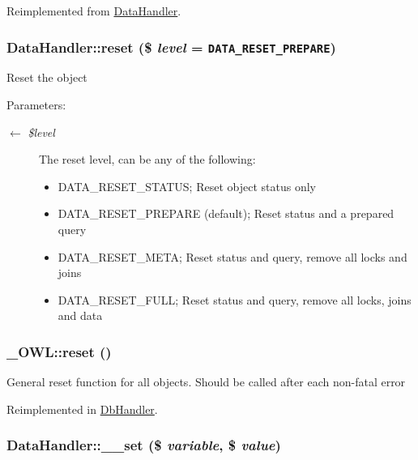 Reimplemented from \hyperlink{classDataHandler_f58cbd10b032e4904fa15ce950d521e2}{DataHandler}.\hypertarget{classDataHandler_b89e1aaad9cd0a37f1c7f13c1d9c0d57}{
\subsubsection{\setlength{\rightskip}{0pt plus 5cm}DataHandler::reset (\$ {\em level} = {\tt {\bf DATA\_\-RESET\_\-PREPARE}})}}
\label{classDataHandler_b89e1aaad9cd0a37f1c7f13c1d9c0d57}


Reset the object \begin{Desc}
\item[Parameters:]
\begin{description}
\item[\mbox{$\leftarrow$} {\em \$level}]The reset level, can be any of the following:\begin{itemize}
\item DATA\_\-RESET\_\-STATUS; Reset object status only\item DATA\_\-RESET\_\-PREPARE (default); Reset status and a prepared query\item DATA\_\-RESET\_\-META; Reset status and query, remove all locks and joins\item DATA\_\-RESET\_\-FULL; Reset status and query, remove all locks, joins and data \end{itemize}
\end{description}
\end{Desc}
\hypertarget{class__OWL_2f2a042bcf31965194c03033df0edc9b}{
\subsubsection{\setlength{\rightskip}{0pt plus 5cm}\_\-OWL::reset ()}}
\label{class__OWL_2f2a042bcf31965194c03033df0edc9b}


General reset function for all objects. Should be called after each non-fatal error 

Reimplemented in \hyperlink{classDbHandler_9982df4830f05803935bb31bac7fae3d}{DbHandler}.\hypertarget{classDataHandler_16c81c9564a7feaf530ce5d51ed99df7}{
\subsubsection{\setlength{\rightskip}{0pt plus 5cm}DataHandler::\_\-\_\-set (\$ {\em variable}, \$ {\em value})}}
\label{classDataHandler_16c81c9564a7feaf530ce5d51ed99df7}


